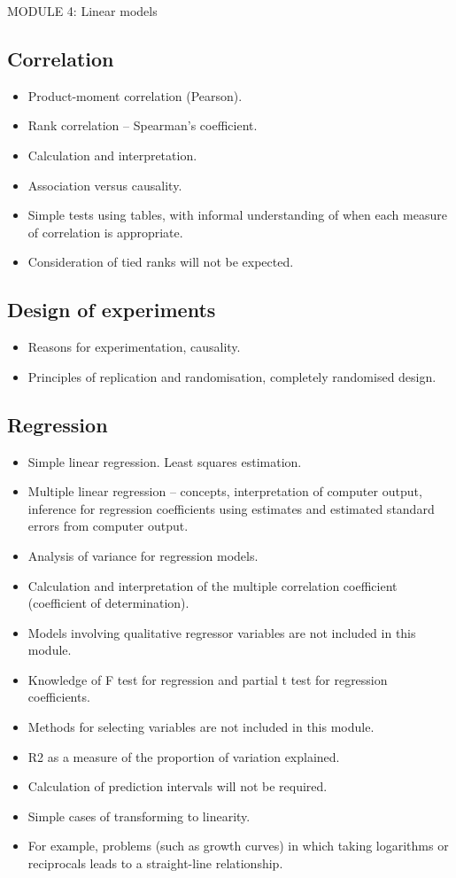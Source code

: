 MODULE 4: Linear models
\subsection*{Correlation}
\begin{itemize}
\item	Product-moment correlation (Pearson). 
\item	Rank correlation – Spearman’s coefficient. 
\item	Calculation and interpretation.
\item	Association versus causality. 
\item	Simple tests using tables, with informal understanding of when each measure of correlation is appropriate. 
\item	Consideration of tied ranks will not be expected.
\end{itemize}
\subsection*{Design of experiments}
\begin{itemize}
\item	Reasons for experimentation, causality.
\item	Principles of replication and randomisation, completely randomised design.
\end{itemize}

\subsection*{Regression}
\begin{itemize}
\item	Simple linear regression. Least squares estimation.
\item	Multiple linear regression – concepts, interpretation of computer output, inference for regression coefficients using estimates and estimated standard errors from computer output.
\item	Analysis of variance for regression models.
\item	Calculation and interpretation of the multiple correlation coefficient (coefficient of determination).
\item	Models involving qualitative regressor variables are not included in this module.
\item	Knowledge of F test for regression and partial t test for regression coefficients. 
\item	Methods for selecting variables are not included in this module.
\item	R2 as a measure of the proportion of variation explained.
\item	Calculation of prediction intervals will not be required.
\item	Simple cases of transforming to linearity.
\item	For example, problems (such as growth curves) in which taking logarithms or reciprocals leads to a straight-line relationship.
\end{itemize}
